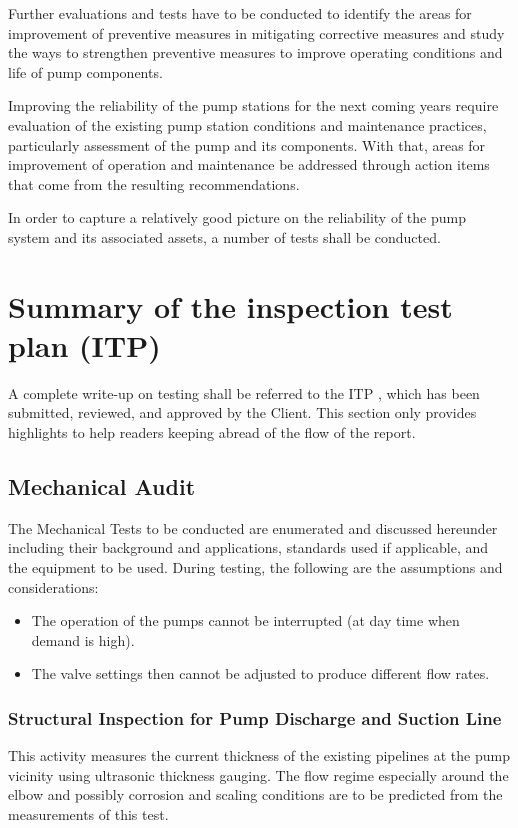 Further evaluations and tests have to be conducted to identify the areas for improvement of preventive measures in mitigating corrective measures and study the ways to strengthen preventive measures to improve operating conditions and life of pump components. 

Improving the reliability of the pump stations for the next coming years require evaluation of the existing pump station conditions and maintenance practices, particularly assessment of the pump and its components. With that, areas for improvement of operation and maintenance be addressed through action items that come from the resulting recommendations.

In order to capture a relatively good picture on the reliability of the pump system and its associated assets, a number of tests shall be conducted. 

\section{Summary of the inspection test plan (ITP)}
\label{231}
A complete write-up on testing shall be referred to the ITP \cite{GHD2018a}, which has been submitted, reviewed, and approved by the Client. This section only provides highlights to help readers keeping abread of the flow of the report.

\subsection{Mechanical Audit}
\label{232}
The Mechanical Tests to be conducted are enumerated and discussed hereunder including their background and applications, standards used if applicable, and the equipment to be used. During testing, the following are the assumptions and considerations:

\begin{itemize}
\item The operation of the pumps cannot be interrupted (at day time when demand is high).
\item The valve settings then cannot be adjusted to produce different flow rates.
\end{itemize}

\subsubsection{Structural Inspection for Pump Discharge and Suction Line}

This activity measures the current thickness of the existing pipelines at the pump vicinity using ultrasonic thickness gauging. The flow regime especially around the elbow and possibly corrosion and scaling conditions are to be predicted from the measurements of this test.

